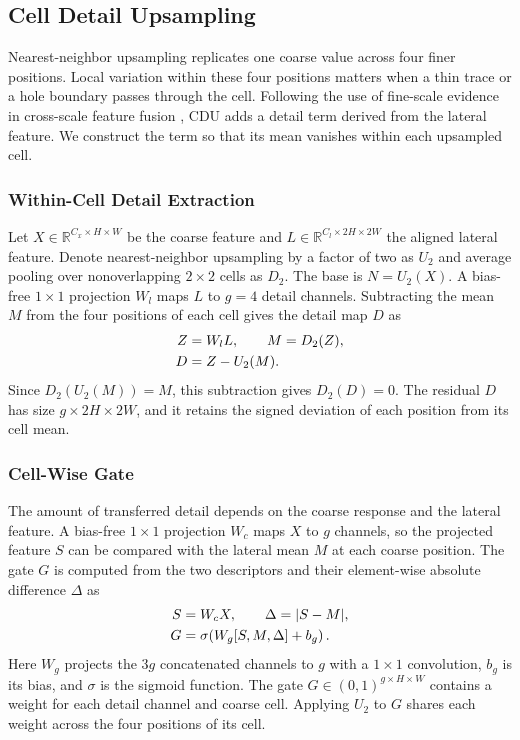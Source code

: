 \documentclass[lettersize,journal]{IEEEtran}
\begin{document}
\subsection{Cell Detail Upsampling}
Nearest-neighbor upsampling replicates one coarse value across four finer positions. Local variation within these four positions matters when a thin trace or a hole boundary passes through the cell. Following the use of fine-scale evidence in cross-scale feature fusion \cite{chen2024freqfusion}, CDU adds a detail term derived from the lateral feature. We construct the term so that its mean vanishes within each upsampled cell.

\subsubsection{Within-Cell Detail Extraction}
Let $X\in\mathbb{R}^{C_x\times H\times W}$ be the coarse feature and $L\in\mathbb{R}^{C_l\times2H\times2W}$ the aligned lateral feature. Denote nearest-neighbor upsampling by a factor of two as $U_2$ and average pooling over nonoverlapping $2\times2$ cells as $D_2$. The base is $N=U_2(X)$. A bias-free $1\times1$ projection $W_l$ maps $L$ to $g=4$ detail channels. Subtracting the mean $M$ from the four positions of each cell gives the detail map $D$ as
\begin{align}
Z &= W_l L,\qquad M=D_2(Z),\notag\\
D &= Z-U_2(M).
\label{eq:cell-detail}
\end{align}
\noindent Since $D_2(U_2(M))=M$, this subtraction gives $D_2(D)=0$. The residual $D$ has size $g\times2H\times2W$, and it retains the signed deviation of each position from its cell mean.

\subsubsection{Cell-Wise Gate}
The amount of transferred detail depends on the coarse response and the lateral feature. A bias-free $1\times1$ projection $W_c$ maps $X$ to $g$ channels, so the projected feature $S$ can be compared with the lateral mean $M$ at each coarse position. The gate $G$ is computed from the two descriptors and their element-wise absolute difference $\Delta$ as
\begin{align}
S &= W_c X,\qquad \Delta=|S-M|,\notag\\
G &= \sigma\!\left(W_g[S,M,\Delta]+b_g\right).
\label{eq:cell-gate}
\end{align}
\noindent Here $W_g$ projects the $3g$ concatenated channels to $g$ with a $1\times1$ convolution, $b_g$ is its bias, and $\sigma$ is the sigmoid function. The gate $G\in(0,1)^{g\times H\times W}$ contains a weight for each detail channel and coarse cell. Applying $U_2$ to $G$ shares each weight across the four positions of its cell.
\end{document}
